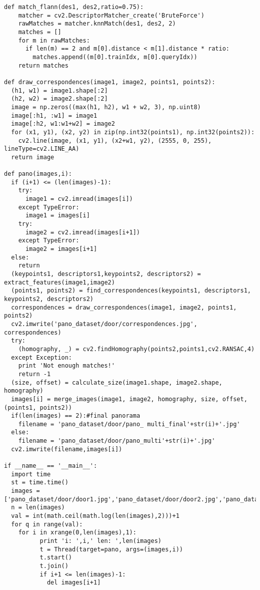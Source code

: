 \begin{lstlisting}
def match_flann(des1, des2,ratio=0.75):
    matcher = cv2.DescriptorMatcher_create('BruteForce')
    rawMatches = matcher.knnMatch(des1, des2, 2)
    matches = []
    for m in rawMatches:
      if len(m) == 2 and m[0].distance < m[1].distance * ratio:
        matches.append((m[0].trainIdx, m[0].queryIdx))
    return matches
  
def draw_correspondences(image1, image2, points1, points2):
  (h1, w1) = image1.shape[:2]
  (h2, w2) = image2.shape[:2]
  image = np.zeros((max(h1, h2), w1 + w2, 3), np.uint8)
  image[:h1, :w1] = image1
  image[:h2, w1:w1+w2] = image2
  for (x1, y1), (x2, y2) in zip(np.int32(points1), np.int32(points2)):
    cv2.line(image, (x1, y1), (x2+w1, y2), (2555, 0, 255), lineType=cv2.LINE_AA)
  return image

def pano(images,i):
  if (i+1) <= (len(images)-1):
    try:
      image1 = cv2.imread(images[i])
    except TypeError:
      image1 = images[i]
    try:
      image2 = cv2.imread(images[i+1])
    except TypeError:
      image2 = images[i+1]
  else:
    return  
  (keypoints1, descriptors1,keypoints2, descriptors2) = extract_features(image1,image2)
  (points1, points2) = find_correspondences(keypoints1, descriptors1, keypoints2, descriptors2)
  correspondences = draw_correspondences(image1, image2, points1, points2)
  cv2.imwrite('pano_dataset/door/correspondences.jpg', correspondences)
  try:
    (homography, _) = cv2.findHomography(points2,points1,cv2.RANSAC,4)
  except Exception:
    print 'Not enough matches!'
    return -1
  (size, offset) = calculate_size(image1.shape, image2.shape, homography)
  images[i] = merge_images(image1, image2, homography, size, offset, (points1, points2))
  if(len(images) == 2):#final panorama
    filename = 'pano_dataset/door/pano_ multi_final'+str(i)+'.jpg'
  else:
    filename = 'pano_dataset/door/pano_multi'+str(i)+'.jpg'
  cv2.imwrite(filename,images[i])
  
if __name__ == '__main__':
  import time
  st = time.time()
  images = ['pano_dataset/door/door1.jpg','pano_dataset/door/door2.jpg','pano_dataset/door/door3.jpg','pano_dataset/door/door4.jpg','pano_dataset/door/door5.jpg','pano_dataset/door/door6.jpg','pano_dataset/door/door7.jpg']
  n = len(images)
  val = int(math.ceil(math.log(len(images),2)))+1
  for q in range(val):
    for i in xrange(0,len(images),1):
          print 'i: ',i,' len: ',len(images)
          t = Thread(target=pano, args=(images,i))
          t.start()
          t.join()
          if i+1 <= len(images)-1:
            del images[i+1]
\end{lstlisting}
